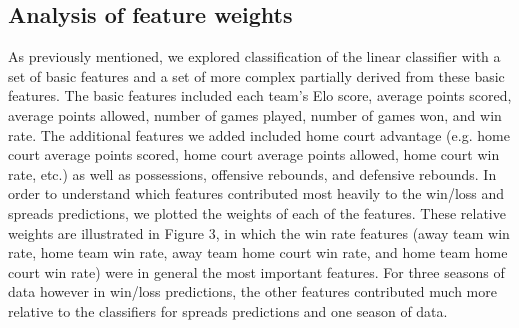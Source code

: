 \documentclass{article}
\begin{document}
\subsection{Analysis of feature weights}

As previously mentioned, we explored classification of the linear classifier with a set of basic features and a set of more complex partially derived from these basic features. The basic features included each team's Elo score, average points scored, average points allowed, number of games played, number of games won, and win rate. The additional features we added included home court advantage (e.g. home court average points scored, home court average points allowed, home court win rate, etc.) as well as possessions, offensive rebounds, and defensive rebounds. In order to understand which features contributed most heavily to the win/loss and spreads predictions, we plotted the weights of each of the features. These relative weights are illustrated in Figure 3, in which the win rate features (away team win rate, home team win rate, away team home court win rate, and home team home court win rate) were in general the most important features. For three seasons of data however in win/loss predictions, the other features contributed much more relative to the classifiers for spreads predictions and one season of data.
\end{document}
